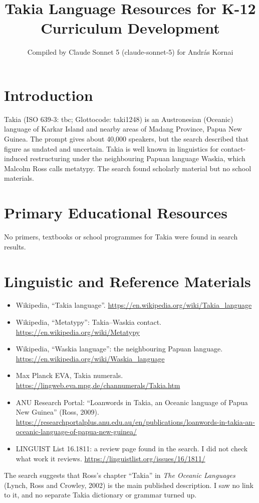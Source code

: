 \documentclass[12pt]{article}
\title{Takia Language Resources for K-12 Curriculum Development}
\author{Compiled by Claude Sonnet 5 (claude-sonnet-5) for Andr\'as Kornai}
\date{}
\begin{document}
\maketitle

\section{Introduction}
Takia (ISO 639-3: tbc; Glottocode: taki1248) is an Austronesian (Oceanic) language of Karkar Island and nearby areas of Madang Province, Papua New Guinea. The prompt gives about 40,000 speakers, but the search described that figure as undated and uncertain. Takia is well known in linguistics for contact-induced restructuring under the neighbouring Papuan language Waskia, which Malcolm Ross calls metatypy. The search found scholarly material but no school materials.

\section{Primary Educational Resources}
No primers, textbooks or school programmes for Takia were found in search results.

\section{Linguistic and Reference Materials}
\begin{itemize}
\item Wikipedia, ``Takia language''. \url{https://en.wikipedia.org/wiki/Takia_language}
\item Wikipedia, ``Metatypy'': Takia--Waskia contact. \url{https://en.wikipedia.org/wiki/Metatypy}
\item Wikipedia, ``Waskia language'': the neighbouring Papuan language. \url{https://en.wikipedia.org/wiki/Waskia_language}
\item Max Planck EVA, Takia numerals. \url{https://lingweb.eva.mpg.de/channumerals/Takia.htm}
\item ANU Research Portal: ``Loanwords in Takia, an Oceanic language of Papua New Guinea'' (Ross, 2009). \url{https://researchportalplus.anu.edu.au/en/publications/loanwords-in-takia-an-oceanic-language-of-papua-new-guinea/}
\item LINGUIST List 16.1811: a review page found in the search. I did not check what work it reviews. \url{https://linguistlist.org/issues/16/1811/}
\end{itemize}
The search suggests that Ross's chapter ``Takia'' in \emph{The Oceanic Languages} (Lynch, Ross and Crowley, 2002) is the main published description. I saw no link to it, and no separate Takia dictionary or grammar turned up.
\end{document}
